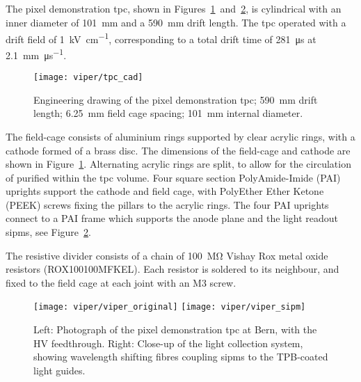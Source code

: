 \subsection{}
\label{sec:ac_viper_tpc}

The pixel demonstration \gls{tpc}, shown in Figures~\ref{fig:viper_cad}~and~\ref{fig:viper_v1per}, is cylindrical with an inner diameter of \SI{101}{\milli\metre} and a \SI{590}{\milli\metre} drift length. 
The \gls{tpc} operated with a drift field of \SI{1}{\kilo\volt\per\centi\metre}, corresponding to a total drift time of \SI{281}{\micro\second} at \SI{2.1}{\milli\metre\per\micro\second}.~\cite{protoLASER}

\begin{figure}[htb]
	\centering
	\texttt{[image: viper/tpc\_cad]}
	\caption{\small Engineering drawing of the pixel demonstration \gls{tpc}; \SI{590}{\milli\metre} drift length; \SI{6.25}{\milli\metre} field cage spacing; \SI{101}{\milli\metre} internal diameter.}
	\label{fig:viper_cad}
\end{figure}
 
The field-cage consists of aluminium rings supported by clear acrylic rings, with a cathode formed of a brass disc. 
The dimensions of the field-cage and cathode are shown in Figure~\ref{fig:viper_cad}.
Alternating acrylic rings are split, to allow for the circulation of purified \lar{} within the \gls{tpc} volume.
Four square section PolyAmide-Imide (PAI) uprights support the cathode and field cage, with PolyEther Ether Ketone (PEEK) screws fixing the pillars to the acrylic rings.
The four PAI uprights connect to a PAI frame which supports the anode plane and the light readout \glspl{sipm}, see Figure~\ref{fig:viper_v1per}.   

The resistive divider consists of a chain of \SI{100}{\mega\ohm} Vishay Rox metal oxide resistors (ROX100100MFKEL).
Each resistor is soldered to its neighbour, and fixed to the field cage at each joint with an M3 screw.   

\begin{figure}[htb]
	\centering
	\texttt{[image: viper/viper\_original]}
	\texttt{[image: viper/viper\_sipm]}
	\caption{\small  Left: Photograph of the  pixel demonstration \gls{tpc} at Bern, with the HV feedthrough.
	Right: Close-up of the light collection system, showing wavelength shifting fibres coupling \glspl{sipm} to the TPB-coated light guides.}
	\label{fig:viper_v1per}
\end{figure}

